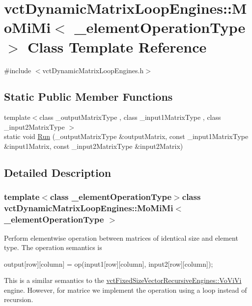 \hypertarget{classvct_dynamic_matrix_loop_engines_1_1_mo_mi_mi}{}\section{vct\+Dynamic\+Matrix\+Loop\+Engines\+:\+:Mo\+Mi\+Mi$<$ \+\_\+element\+Operation\+Type $>$ Class Template Reference}
\label{classvct_dynamic_matrix_loop_engines_1_1_mo_mi_mi}


{\ttfamily \#include $<$vct\+Dynamic\+Matrix\+Loop\+Engines.\+h$>$}

\subsection*{Static Public Member Functions}
\begin{DoxyCompactItemize}
\item 
{\footnotesize template$<$class \+\_\+output\+Matrix\+Type , class \+\_\+input1\+Matrix\+Type , class \+\_\+input2\+Matrix\+Type $>$ }\\static void \hyperlink{classvct_dynamic_matrix_loop_engines_1_1_mo_mi_mi_a5f0f3de20edf0762625afc3f31d4978d}{Run} (\+\_\+output\+Matrix\+Type \&output\+Matrix, const \+\_\+input1\+Matrix\+Type \&input1\+Matrix, const \+\_\+input2\+Matrix\+Type \&input2\+Matrix)
\end{DoxyCompactItemize}


\subsection{Detailed Description}
\subsubsection*{template$<$class \+\_\+element\+Operation\+Type$>$class vct\+Dynamic\+Matrix\+Loop\+Engines\+::\+Mo\+Mi\+Mi$<$ \+\_\+element\+Operation\+Type $>$}

Perform elementwise operation between matrices of identical size and element type. The operation semantics is 
\begin{DoxyCode}
output[row][column] = op(input1[row][column], input2[row][column]);
\end{DoxyCode}


This is a similar semantics to the \hyperlink{classvct_fixed_size_vector_recursive_engines_1_1_vo_vi_vi}{vct\+Fixed\+Size\+Vector\+Recursive\+Engines\+::\+Vo\+Vi\+Vi} engine. However, for matrice we implement the operation using a loop instead of recursion.

